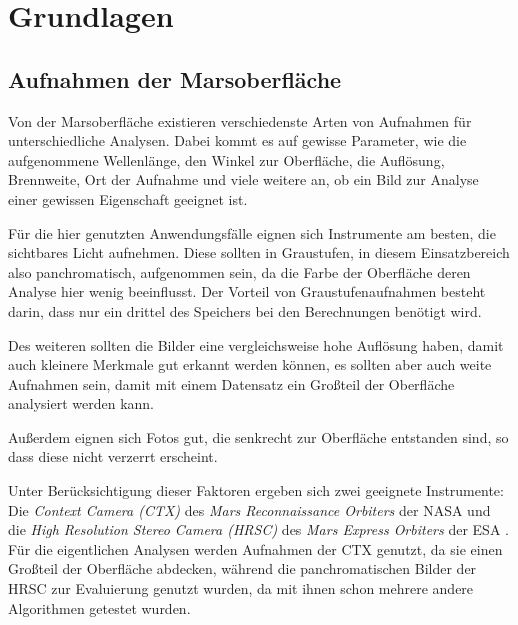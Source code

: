 \chapter{Grundlagen}
\label{chap:grundlagen}


\section{Aufnahmen der Marsoberfläche}
\label{sec:mars_images}

Von der Marsoberfläche existieren verschiedenste Arten von Aufnahmen für unterschiedliche Analysen. Dabei kommt es auf gewisse Parameter, wie \zB die aufgenommene Wellenlänge, den Winkel zur Oberfläche, die Auflösung, Brennweite, Ort der Aufnahme und viele weitere an, ob ein Bild zur Analyse einer gewissen Eigenschaft geeignet ist.

Für die hier genutzten Anwendungsfälle eignen sich Instrumente am besten, die sichtbares Licht aufnehmen. Diese sollten in Graustufen, in diesem Einsatzbereich also panchromatisch, aufgenommen sein, da die Farbe der Oberfläche deren Analyse hier wenig beeinflusst. Der Vorteil von Graustufenaufnahmen besteht darin, dass nur ein drittel des Speichers bei den Berechnungen benötigt wird.

Des weiteren sollten die Bilder eine vergleichsweise hohe Auflösung haben, damit auch kleinere Merkmale gut erkannt werden können, es sollten aber auch weite Aufnahmen sein, damit mit einem Datensatz ein Großteil der Oberfläche analysiert werden kann.

Außerdem eignen sich Fotos gut, die senkrecht zur Oberfläche entstanden sind, so dass diese nicht verzerrt erscheint.

Unter Berücksichtigung dieser Faktoren ergeben sich \ua zwei geeignete Instrumente:
Die \textit{Context Camera (CTX)} des \textit{Mars Reconnaissance Orbiters} der NASA \cite{malin_07} und die \textit{High Resolution Stereo Camera (HRSC)} des \textit{Mars Express Orbiters} der ESA \cite{hrsc}. Für die eigentlichen Analysen werden Aufnahmen der CTX genutzt, da sie einen Großteil der Oberfläche abdecken, während die panchromatischen Bilder der HRSC zur Evaluierung genutzt wurden, da mit ihnen schon mehrere andere Algorithmen getestet wurden.

